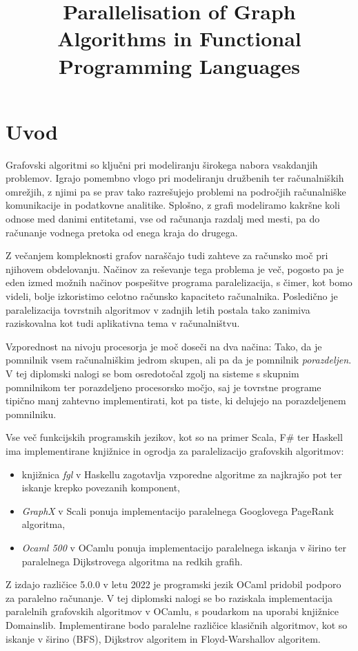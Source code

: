 \documentclass[mat1, tisk]{fmfdelo}
\title{Parallelisation of Graph Algorithms in Functional Programming Languages}
\begin{document}
\section{Uvod}

Grafovski algoritmi so ključni pri modeliranju širokega nabora vsakdanjih problemov.
Igrajo pomembno vlogo pri modeliranju družbenih ter računalniških omrežjih, z njimi pa se prav tako razrešujejo 
problemi na področjih računalniške komunikacije in podatkovne analitike. Splošno, z grafi  modeliramo kakršne 
koli odnose med danimi entitetami, vse od računanja razdalj med mesti, pa do računanje vodnega pretoka 
od enega kraja do drugega.

Z večanjem kompleknosti grafov naraščajo tudi zahteve za računsko moč pri njihovem obdelovanju.
Načinov za reševanje tega problema je več, pogosto pa
je eden izmed možnih načinov pospešitve programa paralelizacija, s čimer, kot bomo videli, bolje izkoristimo celotno
računsko kapaciteto računalnika. Posledično je paralelizacija tovrstnih algoritmov v zadnjih letih postala tako
zanimiva raziskovalna kot tudi aplikativna tema v računalništvu.

Vzporednost na nivoju procesorja je moč doseči na dva načina: 
Tako, da je pomnilnik vsem računalniškim jedrom skupen, ali pa da je pomnilnik \textit{porazdeljen}. 
V tej diplomski nalogi se bom osredotočal zgolj na sisteme s skupnim pomnilnikom ter porazdeljeno procesorsko močjo, 
saj je tovrstne programe tipično manj zahtevno implementirati, kot pa tiste, ki delujejo na porazdeljenem pomnilniku.

Vse več funkcijskih programskih jezikov, kot so na primer Scala, F\# ter Haskell ima implementirane knjižnice
in ogrodja za paralelizacijo grafovskih algoritmov:
\begin{itemize}
    \item knjižnica \textit{fgl} v Haskellu \cite{haskell_fgl} zagotavlja vzporedne algoritme za najkrajšo pot 
    ter iskanje krepko povezanih komponent,
    \item \textit{GraphX} v Scali \cite{graphx} ponuja implementacijo paralelnega Googlovega PageRank algoritma,
    \item \textit{Ocaml 500} v OCamlu \cite{ocaml_multicore_500} ponuja implementacijo paralelnega iskanja v širino ter paralelnega Dijkstrovega algoritma na redkih grafih.
\end{itemize}

Z izdajo različice 5.0.0 v letu 2022 je programski jezik OCaml pridobil podporo za paralelno računanje.
V tej diplomski nalogi se bo raziskala implementacija paralelnih grafovskih algoritmov v OCamlu, s
poudarkom na uporabi knjižnice Domainslib. Implementirane bodo paralelne različice klasičnih algoritmov, kot so
iskanje v širino (BFS), Dijkstrov algoritem in Floyd-Warshallov algoritem.
\end{document}
